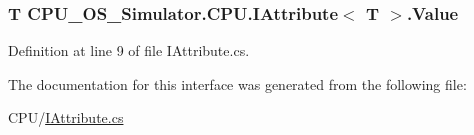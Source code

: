 \subsubsection[{Value}]{\setlength{\rightskip}{0pt plus 5cm}T {\bf C\+P\+U\+\_\+\+O\+S\+\_\+\+Simulator.\+C\+P\+U.\+I\+Attribute}$<$ T $>$.Value\hspace{0.3cm}{\ttfamily [get]}}\label{interface_c_p_u___o_s___simulator_1_1_c_p_u_1_1_i_attribute_a7c1cc8ee7f3ce5334f7a4ace4a9db633}


Definition at line 9 of file I\+Attribute.\+cs.



The documentation for this interface was generated from the following file\+:\begin{DoxyCompactItemize}
\item 
C\+P\+U/\hyperlink{_c_p_u_2_i_attribute_8cs}{I\+Attribute.\+cs}\end{DoxyCompactItemize}
